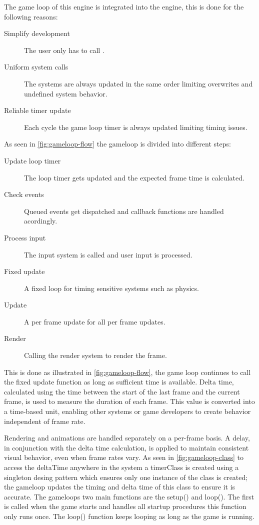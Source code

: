 \documentclass{projdoc}
\begin{document}
The game loop of this engine is integrated into the engine, this is done for the
following reasons:\noparbreak
\begin{description}
	\item[Simplify development] The user only has to call .
	\item[Uniform system calls] The systems are always updated in the same order
		limiting overwrites and undefined system behavior.
	\item[Reliable timer update] Each cycle the game loop timer is always updated
		limiting timing issues.
\end{description}

As seen in \cref{fig:gameloop-flow} the gameloop is divided into different
steps:\noparbreak
\begin{description}
	\item[Update loop timer] The loop timer gets updated and the expected frame time is
		calculated.
	\item[Check events] Queued events get dispatched and callback functions are handled
		acordingly.
	\item[Process input] The input system is called and user input is processed.
	\item[Fixed update] A fixed loop for timing sensitive systems such as physics.
	\item[Update] A per frame update for all per frame updates.
	\item[Render] Calling the render system to render the frame.
\end{description}

This is done as illustrated in \cref{fig:gameloop-flow}, the game loop continues to call
the fixed update function as long as sufficient time is available. Delta time,
calculated using the time between the start of the last frame and the current frame,
is used to measure the duration of each frame. This value is converted into a
time-based unit, enabling other systems or game developers to create behavior
independent of frame rate.

Rendering and animations are handled separately on a per-frame basis. A delay, in
conjunction with the delta time calculation, is applied to maintain consistent visual
behavior, even when frame rates vary. As seen in \cref{fig:gameloop-class} to access the
deltaTime anywhere in the system a timerClass is created using a singleton desing
pattern which ensures only one instance of the class is created; the gameloop updates
the timing and delta time of this class to ensure it is accurate. The gameloops two
main functions are the setup() and loop(). The first is called when the game starts
and handles all startup procedures this function only runs once. The loop() function
keeps looping as long as the game is running.
\end{document}
